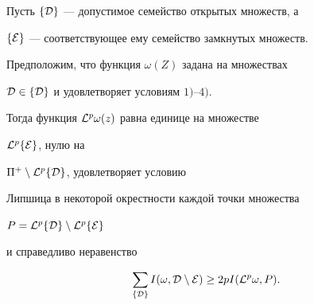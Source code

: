 \begin{thm}


Пусть $\{{\cal D}\}$ --- допустимое семейство открытых множеств, а


$\{{\cal E}\}$ --- соответствующее ему семейство замкнутых множеств.


Предположим, что функция $\omega (Z)$ задана на множествах


${\cal D}\in \{{\cal D}\}$ и удовлетворяет условиям $1)$--$4)$.


Тогда функция ${\cal L}^p\omega (z)$ равна единице на множестве


${\cal L}^p\{{\cal E}\}$, нулю на


$\Pi^+\setminus{\cal L}^p \{{\cal D}\}$, удовлетворяет условию


Липшица в некоторой окрестности каждой точки множества


$P ={\cal L}^p\{{\cal D}\}\setminus{\cal L}^p\{{\cal E}\}$


и справедливо неравенство


\begin{equation}


\sum\limits_{\{{\cal D}\}} I(\omega,{\cal D}\setminus{\cal E})\geq 2pI({\cal


L}^p\omega,P).


\end{equation}


\end{thm}





